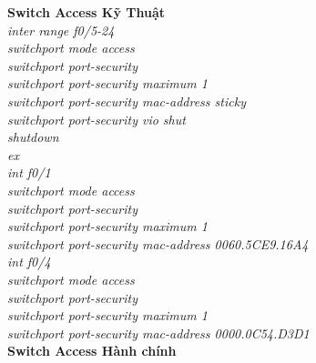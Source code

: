 \documentclass[a4paper, 12pt]{article}
\begin{document}
\hspace*{1cm}\textbf{Switch Access Kỹ Thuật}\\
\hspace*{2cm}\textit{inter range f0/5-24\\
\hspace*{2cm}switchport mode access\\
\hspace*{2cm}switchport port-security\\
\hspace*{2cm}switchport port-security maximum 1\\
\hspace*{2cm}switchport port-security mac-address sticky\\
\hspace*{2cm}switchport port-security vio shut\\
\hspace*{2cm}shutdown\\
\hspace*{2cm}ex\\
\hspace*{2cm}int f0/1\\
\hspace*{2cm}switchport mode access\\
\hspace*{2cm}switchport port-security\\
\hspace*{2cm}switchport port-security maximum 1\\
\hspace*{2cm}switchport port-security mac-address 0060.5CE9.16A4\\
\hspace*{2cm}int f0/4\\
\hspace*{2cm}switchport mode access\\
\hspace*{2cm}switchport port-security\\
\hspace*{2cm}switchport port-security maximum 1\\
\hspace*{2cm}switchport port-security mac-address 0000.0C54.D3D1\\}
\hspace*{1cm}\textbf{Switch Access Hành chính}\\
\end{document}
